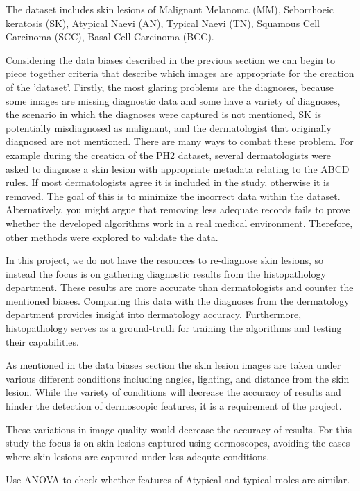 The dataset includes skin lesions of Malignant Melanoma (MM), Seborrhoeic keratosis (SK), Atypical Naevi (AN), Typical Naevi (TN), Squamous Cell Carcinoma (SCC), Basal Cell Carcinoma (BCC). 

Considering the data biases described in the previous section we can begin to piece together criteria that describe which images are appropriate for the creation of the 'dataset'. Firstly, the most glaring problems are the diagnoses, because some images are missing diagnostic data and some have a variety of diagnoses, the scenario in which the diagnoses were captured is not mentioned, 
SK is potentially misdiagnosed as malignant, and the dermatologist that originally diagnosed are not mentioned. There are many ways to combat these problem. For example during the creation of the PH2 dataset\cite{mendonca2013}, several dermatologists were asked to diagnose a skin lesion with appropriate metadata relating to the ABCD rules. If most dermatologists agree it is included in the study, otherwise it is removed. The goal of this is to minimize the incorrect data within the dataset. Alternatively, you might argue that removing less adequate records fails to prove whether the developed algorithms work in a real medical environment. Therefore, other methods were explored to validate the data.

In this project, we do not have the resources to re-diagnose skin lesions, so instead the focus is on gathering diagnostic results from the histopathology department. These results are more accurate than dermatologists\cite{Morton1998} and counter the mentioned biases. Comparing this data with the diagnoses from the dermatology department provides insight into dermatology accuracy. Furthermore, histopathology serves as a ground-truth for training the algorithms and testing their capabilities.

As mentioned in the data biases section the skin lesion images are taken under various different conditions including angles, lighting, and distance from the skin lesion. While the variety of conditions will decrease the accuracy of results and hinder the detection of dermoscopic features, it is a requirement of the project. 

These variations in image quality would decrease the accuracy of results. For this study the focus is on skin lesions captured using dermoscopes, avoiding the cases where skin lesions are captured under less-adequte conditions.

Use ANOVA to check whether features of Atypical and typical moles are similar.


